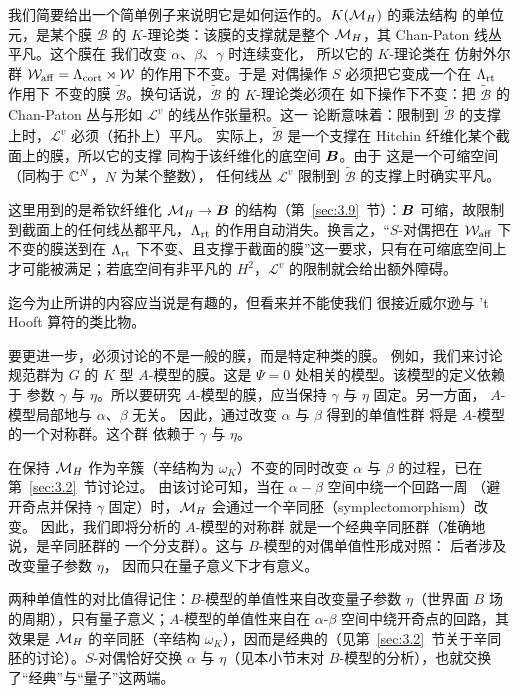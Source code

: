 我们简要给出一个简单例子来说明它是如何运作的。$K({{\mathcal{M}}_H})$ 的乘法结构
的单位元，是某个膜 ${\mathcal B}$ 的 $K$-理论类：该膜的支撑就是整个
${{\mathcal{M}}_H}$，其 Chan-Paton 线丛平凡。这个膜在
我们改变 $\alpha$、$\beta$、$\gamma$ 时连续变化，
所以它的 $K$-理论类在
仿射外尔群 ${\mathcal W}_{\rm aff}=\Lambda_{\rm cort}\rtimes{\mathcal W}$ 的作用下不变。于是
对偶操作 $S$ 必须把它变成一个在 $\Lambda_{\rm rt}$ 作用下
不变的膜 $\tilde{\mathcal
B}$。换句话说，$\tilde {\mathcal B}$ 的 $K$-理论类必须在
如下操作下不变：把 $\tilde
{\mathcal B}$ 的 Chan-Paton 丛与形如 ${\mathcal L}^v$ 的线丛作张量积。这一
论断意味着：限制到 $\tilde{\mathcal B}$ 的支撑上时，${\mathcal L}^v$ 必须（拓扑上）平凡。
实际上，$\tilde{\mathcal B}$ 是一个支撑在 Hitchin
纤维化某个截面上的膜，所以它的支撑
同构于该纤维化的底空间 $\bm{B}$。由于
这是一个可缩空间（同构于 ${\mathbb{C}}^N$，$N$ 为某个整数），
任何线丛 ${\mathcal L}^v$ 限制到
$\tilde{\mathcal B}$ 的支撑上时确实平凡。

\begin{yizhu}[物理图像补充]这里用到的是希钦纤维化 ${{\mathcal{M}}_H}\to\bm{B}$ 的结构（第~\ref{sec:3.9}~节）：$\bm{B}$ 可缩，故限制到截面上的任何线丛都平凡，$\Lambda_{\rm rt}$ 的作用自动消失。换言之，“$S$-对偶把在 ${\mathcal W}_{\rm aff}$ 下不变的膜送到在 $\Lambda_{\rm rt}$ 下不变、且支撑于截面的膜”这一要求，只有在可缩底空间上才可能被满足；若底空间有非平凡的 $H^2$，$\mathcal L^v$ 的限制就会给出额外障碍。\end{yizhu}

\bigskip{}

迄今为止所讲的内容应当说是有趣的，但看来并不能使我们
很接近威尔逊与 't Hooft 算符的类比物。

要更进一步，必须讨论的不是一般的膜，而是特定种类的膜。
例如，我们来讨论规范群为 $G$ 的 $K$ 型 $A$-模型的膜。这是
$\Psi=0$ 处相关的模型。该模型的定义依赖于
参数 $\gamma$ 与 $\eta$。所以要研究
$A$-模型的膜，应当保持 $\gamma$ 与 $\eta$ 固定。另一方面，
$A$-模型局部地与 $\alpha$、$\beta$ 无关。
因此，通过改变 $\alpha$ 与 $\beta$ 得到的单值性群
将是 $A$-模型的一个对称群。这个群
依赖于 $\gamma$ 与 $\eta$。

在保持 ${{\mathcal{M}}_H}$ 作为辛簇（辛结构为 $\omega_K$）不变的同时改变
$\alpha$ 与 $\beta$ 的过程，已在第~\ref{sec:3.2}~节讨论过。
由该讨论可知，当在 $\alpha-\beta$ 空间中绕一个回路一周
（避开奇点并保持 $\gamma$ 固定）时，${{\mathcal{M}}_H}$ 会通过一个辛同胚（symplectomorphism）改变。
因此，我们即将分析的 $A$-模型的对称群
就是一个经典辛同胚群（准确地说，是辛同胚群的
一个分支群）。这与 $B$-模型的对偶单值性形成对照：
后者涉及改变量子参数 $\eta$，
因而只在量子意义下才有意义。

\begin{yizhu}[易错点]两种单值性的对比值得记住：$B$-模型的单值性来自改变量子参数 $\eta$（世界面 $B$ 场的周期），只有量子意义；$A$-模型的单值性来自在 $\alpha$-$\beta$ 空间中绕开奇点的回路，其效果是 ${{\mathcal{M}}_H}$ 的辛同胚（辛结构 $\omega_K$），因而是经典的（见第~\ref{sec:3.2}~节关于辛同胚的讨论）。$S$-对偶恰好交换 $\alpha$ 与 $\eta$（见本小节末对 $B$-模型的分析），也就交换了“经典”与“量子”这两端。\end{yizhu}

